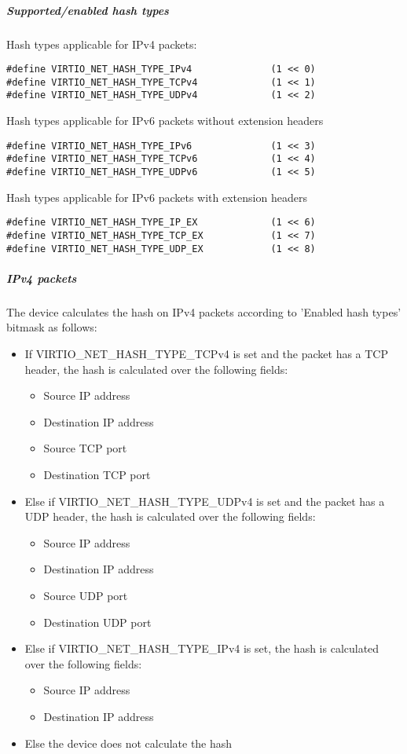 \subparagraph{Supported/enabled hash types}
\label{sec:Device Types / Network Device / Device Operation / Processing of Incoming Packets / Hash calculation for incoming packets / Supported/enabled hash types}
Hash types applicable for IPv4 packets:
\begin{lstlisting}
#define VIRTIO_NET_HASH_TYPE_IPv4              (1 << 0)
#define VIRTIO_NET_HASH_TYPE_TCPv4             (1 << 1)
#define VIRTIO_NET_HASH_TYPE_UDPv4             (1 << 2)
\end{lstlisting}
Hash types applicable for IPv6 packets without extension headers
\begin{lstlisting}
#define VIRTIO_NET_HASH_TYPE_IPv6              (1 << 3)
#define VIRTIO_NET_HASH_TYPE_TCPv6             (1 << 4)
#define VIRTIO_NET_HASH_TYPE_UDPv6             (1 << 5)
\end{lstlisting}
Hash types applicable for IPv6 packets with extension headers
\begin{lstlisting}
#define VIRTIO_NET_HASH_TYPE_IP_EX             (1 << 6)
#define VIRTIO_NET_HASH_TYPE_TCP_EX            (1 << 7)
#define VIRTIO_NET_HASH_TYPE_UDP_EX            (1 << 8)
\end{lstlisting}

\subparagraph{IPv4 packets}
\label{sec:Device Types / Network Device / Device Operation / Processing of Incoming Packets / Hash calculation for incoming packets / IPv4 packets}
The device calculates the hash on IPv4 packets according to 'Enabled hash types' bitmask as follows:
\begin{itemize}
\item If VIRTIO_NET_HASH_TYPE_TCPv4 is set and the packet has
a TCP header, the hash is calculated over the following fields:
\begin{itemize}
\item Source IP address
\item Destination IP address
\item Source TCP port
\item Destination TCP port
\end{itemize}
\item Else if VIRTIO_NET_HASH_TYPE_UDPv4 is set and the
packet has a UDP header, the hash is calculated over the following fields:
\begin{itemize}
\item Source IP address
\item Destination IP address
\item Source UDP port
\item Destination UDP port
\end{itemize}
\item Else if VIRTIO_NET_HASH_TYPE_IPv4 is set, the hash is
calculated over the following fields:
\begin{itemize}
\item Source IP address
\item Destination IP address
\end{itemize}
\item Else the device does not calculate the hash
\end{itemize}

